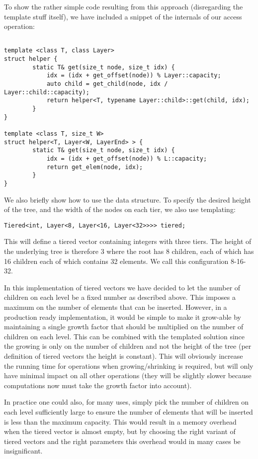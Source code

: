 To show the rather simple code resulting from this approach (disregarding the template stuff itself), we have included a snippet of the internals of our access operation:

\begin{verbatim}

template <class T, class Layer>
struct helper {
        static T& get(size_t node, size_t idx) {
            idx = (idx + get_offset(node)) % Layer::capacity;
            auto child = get_child(node, idx / Layer::child::capacity);
            return helper<T, typename Layer::child>::get(child, idx);
        }
}

template <class T, size_t W>
struct helper<T, Layer<W, LayerEnd> > {
        static T& get(size_t node, size_t idx) {
            idx = (idx + get_offset(node)) % L::capacity;
            return get_elem(node, idx);
        }
}
\end{verbatim}

We also briefly show how to use the data structure. To specify the desired height of the tree, and the width of the nodes on each tier, we also use templating:

\begin{verbatim}
Tiered<int, Layer<8, Layer<16, Layer<32>>>> tiered;
\end{verbatim}

This will define a tiered vector containing integers with three tiers. The
height of the underlying tree is therefore 3 where the root has 8 children,
each of which has 16 children each of which contains 32 elements. We call this configuration 8-16-32.

In this implementation of tiered vectors we have decided to let
the number of children on each level be a fixed number as described above. This
imposes a maximum on the number of elements that can be inserted. However, in a
production ready implementation, it would be simple to make it grow-able by
maintaining a single growth factor that should be multiplied on the number
of children on each level. This can be combined with the templated solution
since the growing is only on the number of children and not the height of the
tree (per definition of tiered vectors the height is constant). This will
obviously increase the running time for operations when growing/shrinking is
required, but will only have minimal impact on all other operations (they will
be slightly slower because computations now must take the growth factor into
account).

In practice one could also, for many uses, simply pick the number of children
on each level sufficiently large to ensure the number of elements that will be
inserted is less than the maximum capacity. This would result in a memory
overhead when the tiered vector is almost empty, but by choosing the right
variant of tiered vectors and the right parameters this overhead would in many
cases be insignificant.
